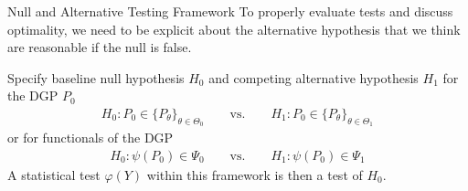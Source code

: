 \documentclass[aspectratio=169, handout]{beamer}
\begin{document}
{\footnotesize
\begin{frame}{Null and Alternative Testing Framework}
To properly evaluate tests and discuss optimality, we need to be
explicit about the \alert{alternative} hypothesis that we think are
reasonable if the null is false.

Specify baseline \alert{null hypothesis} $H_0$ and competing
\alert{alternative hypothesis} $H_1$ for the DGP $P_0$
\begin{align}
  H_0: P_0\in\{P_{\theta}\}_{\theta\in\Theta_0}
  \qquad \text{vs.}\qquad
  H_1: P_0\in\{P_{\theta}\}_{\theta\in\Theta_1}
  \label{nullalt}
\end{align}
or for functionals of the DGP
\begin{align*}
  H_0: \psi(P_0)\in \Psi_0
  \qquad \text{vs.}\qquad
  H_1: \psi(P_0)\in \Psi_1
\end{align*}
A statistical test $\varphi(Y)$ within this framework is then a test of
$H_0$.


\end{frame}
}
\end{document}
